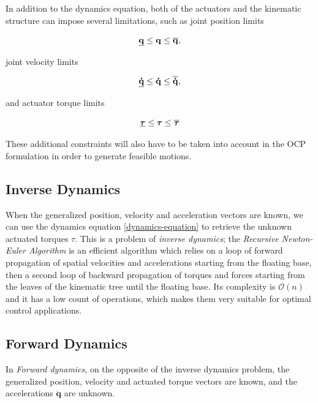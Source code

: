 In addition to the dynamics equation, both of the actuators and the
kinematic structure can impose several limitations, such as joint
position limits

\begin{equation}
  \underline{\mathbf{q}} \le \mathbf{q} \le \overline{\mathbf{q}},
\end{equation}

joint velocity limits

\begin{equation}
  \underline{\mathbf{\dot{q}}} \le \mathbf{\dot{q}} \le
  \overline{\mathbf{\dot{q}}},
\end{equation}

and actuator torque limits

\begin{equation}
  \underline{\boldsymbol{\tau}} \le \boldsymbol{\tau} \le
  \overline{\boldsymbol{\tau}}
\end{equation}

These additional constraints will also have to be taken into account
in the OCP formulation in order to generate feasible motions.

\subsection{Inverse Dynamics}

When the generalized position, velocity and acceleration vectors are
known, we can use the dynamics equation \ref{dynamics-equation} to
retrieve the unknown actuated torques $\mathbb{\tau}$. This is a
problem of \emph{inverse dynamics}; the \emph{Recursive Newton-Euler
  Algorithm} is an efficient algorithm which relies on a loop of
forward propagation of spatial velocities and accelerations starting
from the floating base, then a second loop of backward propagation of
torques and forces starting from the leaves of the kinematic tree
until the floating base. Its complexity is $\mathcal{O}(n)$ and it has
a low count of operations, which makes them very suitable for optimal
control applications.

\subsection{Forward Dynamics}

In \emph{Forward dynamics}, on the opposite of the inverse dynamics
problem, the generalized position, velocity and actuated torque
vectors are known, and the accelerations $\ddot{\mathbf{q}}$ are
unknown.

